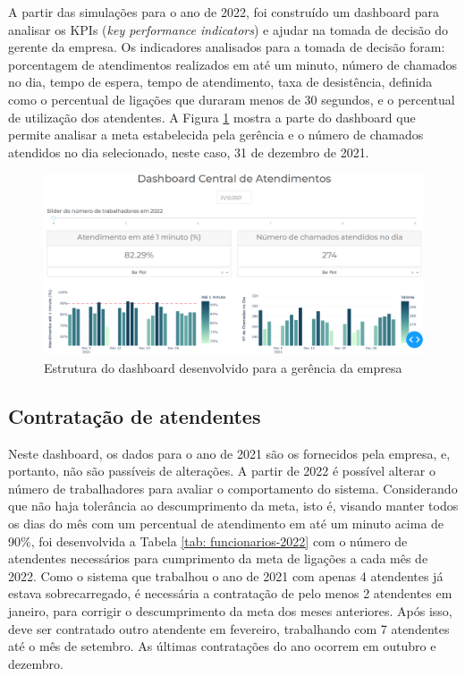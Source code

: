 A partir das simulações para o ano de 2022, foi construído um dashboard para analisar os KPIs (\textit{key performance indicators}) e ajudar na tomada de decisão do gerente da empresa. Os indicadores analisados para a tomada de decisão foram: porcentagem de atendimentos realizados em até um minuto, número de chamados no dia, tempo de espera, tempo de atendimento, taxa de desistência, definida como o percentual de ligações que duraram menos de 30 segundos, e o percentual de utilização dos atendentes. A Figura \ref*{fig: dashboard} mostra a parte do dashboard que permite analisar a meta estabelecida pela gerência e o número de chamados atendidos no dia selecionado, neste caso, 31 de dezembro de 2021.

\begin{figure}[H]
    \centering
    \includegraphics[scale=0.45]{propostas/dashboard.png}
    \caption{Estrutura do dashboard desenvolvido para a gerência da empresa}
    \label{fig: dashboard}
\end{figure}

\subsection{Contratação de atendentes}
Neste dashboard, os dados para o ano de 2021 são os fornecidos pela empresa, e, portanto, não são passíveis de alterações. A partir de 2022 é possível alterar o número de trabalhadores para avaliar o comportamento do sistema. Considerando que não haja tolerância ao descumprimento da meta, isto é, visando manter todos os dias do mês com um percentual de atendimento em até um minuto acima de 90\%, foi desenvolvida a Tabela \ref*{tab: funcionarios-2022} com o número de atendentes necessários para cumprimento da meta de ligações a cada mês de 2022. Como o sistema que trabalhou o ano de 2021 com apenas 4 atendentes já estava sobrecarregado, é necessária a contratação de pelo menos 2 atendentes em janeiro, para corrigir o descumprimento da meta dos meses anteriores. Após isso, deve ser contratado outro atendente em fevereiro, trabalhando com 7 atendentes até o mês de setembro. As últimas contratações do ano ocorrem em outubro e dezembro.

